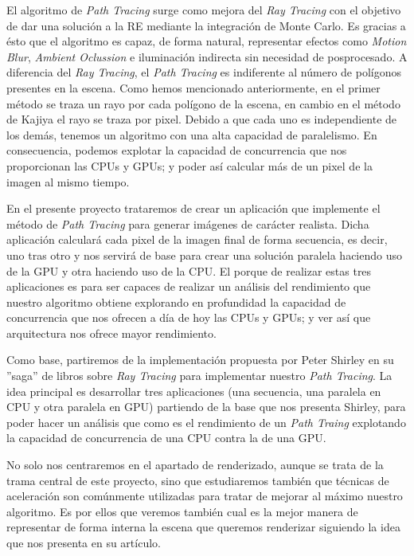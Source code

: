 \documentclass[titlepage,12pt]{report}
\begin{document}
El algoritmo de \textit{Path Tracing} surge como mejora del \textit{Ray Tracing} con el objetivo de dar una solución a la RE mediante la integración de Monte Carlo. Es gracias a ésto que el algoritmo es capaz, de forma natural, representar efectos como \textit{Motion Blur}, \textit{Ambient Oclussion} e iluminación indirecta sin necesidad de posprocesado. A diferencia del \textit{Ray Tracing}, el \textit{Path Tracing} es indiferente al número de polígonos presentes en la escena. Como hemos mencionado anteriormente, en el primer método se traza un rayo por cada polígono de la escena, en cambio en el método de Kajiya el rayo se traza por pixel. Debido a que cada uno es independiente de los demás, tenemos un algoritmo con una alta capacidad de paralelismo. En consecuencia, podemos explotar la capacidad de concurrencia que nos proporcionan las CPUs y GPUs; y poder así calcular más de un pixel de la imagen al mismo tiempo.

En el presente proyecto trataremos de crear un aplicación que implemente el método de \textit{Path Tracing} para generar imágenes de carácter realista. Dicha aplicación calculará cada pixel de la imagen final de forma secuencia, es decir, uno tras otro y nos servirá de base para crear una solución paralela haciendo uso de la GPU y otra haciendo uso de la CPU. El porque de realizar estas tres aplicaciones es para ser capaces de realizar un análisis del rendimiento que nuestro algoritmo obtiene explorando en profundidad la capacidad de concurrencia que nos ofrecen a día de hoy las CPUs y GPUs; y ver así que arquitectura nos ofrece mayor rendimiento.

Como base, partiremos de la implementación propuesta por Peter Shirley en su ''saga'' de libros sobre \textit{Ray Tracing} \citep{ShirleyRTA, ShirleyRTB, ShirleyRTC} para implementar nuestro \textit{Path Tracing}. La idea principal es desarrollar tres aplicaciones (una secuencia, una paralela en CPU y otra paralela en GPU) partiendo de la base que nos presenta Shirley, para poder hacer un análisis que como es el rendimiento de un \textit{Path Traing} explotando la capacidad de concurrencia de una CPU contra la de una GPU.

No solo nos centraremos en el apartado de renderizado, aunque se trata de la trama central de este proyecto, sino que estudiaremos también que técnicas de aceleración son comúnmente utilizadas para tratar de mejorar al máximo nuestro algoritmo. Es por ellos que veremos también cual es la mejor manera de representar de forma interna la escena que queremos renderizar siguiendo la idea que nos presenta \citep{Karras2012} en su artículo.
\end{document}
